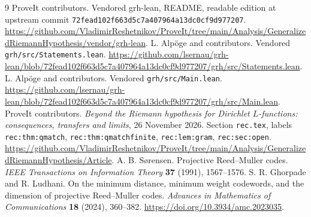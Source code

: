 \documentclass[11pt]{article}
\theoremstyle{remark}\newtheorem{remark}[theorem]{Remark}
\begin{document}
\begin{thebibliography}{9}
 ProveIt contributors. Vendored grh-lean, README, readable edition at upstream commit \texttt{72fead102f663d5c7a407964a13dc0cf9d977207}. \url{https://github.com/VladimirReshetnikov/ProveIt/tree/main/Analysis/GeneralizedRiemannHypothesis/vendor/grh-lean}.
 L. Alp\"oge and contributors. Vendored \texttt{grh/src/Statements.lean}. \url{https://github.com/lsernau/grh-lean/blob/72fead102f663d5c7a407964a13dc0cf9d977207/grh/src/Statements.lean}.
 L. Alp\"oge and contributors. Vendored \texttt{grh/src/Main.lean}. \url{https://github.com/lsernau/grh-lean/blob/72fead102f663d5c7a407964a13dc0cf9d977207/grh/src/Main.lean}.
 ProveIt contributors. \emph{Beyond the Riemann hypothesis for Dirichlet $L$-functions: consequences, transfers and limits}, 26 November 2026. Section \texttt{rec.tex}, labels \texttt{rec:thm:qmatch}, \texttt{rec:thm:qmatchfinite}, \texttt{rec:lem:gram}, \texttt{rec:sec:open}. \url{https://github.com/VladimirReshetnikov/ProveIt/tree/main/Analysis/GeneralizedRiemannHypothesis/Article}.
 A. B. S\o rensen. Projective Reed--Muller codes. \emph{IEEE Transactions on Information Theory} \textbf{37} (1991), 1567--1576.
 S. R. Ghorpade and R. Ludhani. On the minimum distance, minimum weight codewords, and the dimension of projective Reed--Muller codes. \emph{Advances in Mathematics of Communications} \textbf{18} (2024), 360--382. \url{https://doi.org/10.3934/amc.2023035}.
\end{thebibliography}
\end{document}

